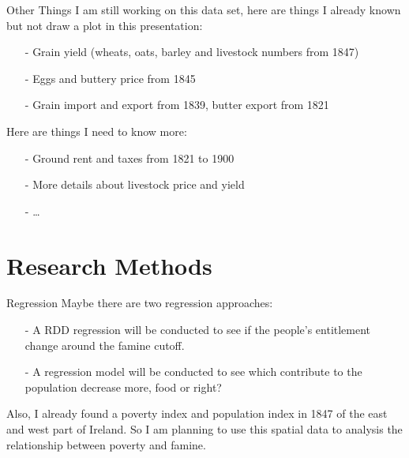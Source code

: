 \documentclass{beamer}[12pt]
\begin{document}
\begin{frame}{Other Things}
	I am still working on this data set, here are things I already known but not draw a plot in this presentation:
	\begin{itemize}
		\item[-] Grain yield (wheats, oats, barley and livestock numbers from 1847)
		\item[-] Eggs and buttery price from 1845 
		\item[-] Grain import and export from 1839, butter export from 1821
	\end{itemize}
	Here are things I need to know more: 
	\begin{itemize}
		\item[-] Ground rent and taxes from 1821 to 1900
		\item[-] More details about livestock price and yield 
		\item[-] \ldots 
	\end{itemize}
\end{frame}

\section{Research Methods}
\begin{frame}{Regression}
	Maybe there are two regression approaches:
	\begin{itemize}
		\item[-] A RDD regression will be conducted to see if the people's entitlement change around the famine cutoff.
		\item[-] A regression model will be conducted to see which contribute to the population decrease more, food or right?
	\end{itemize}
	\vspace*{.5cm}
	Also, I already found a poverty index and population index in 1847 of the east and west part of Ireland. So I am planning to use this spatial data to analysis the relationship between poverty and famine.
\end{frame}

\begin{frame}
	
	
\end{frame}
\end{document}
